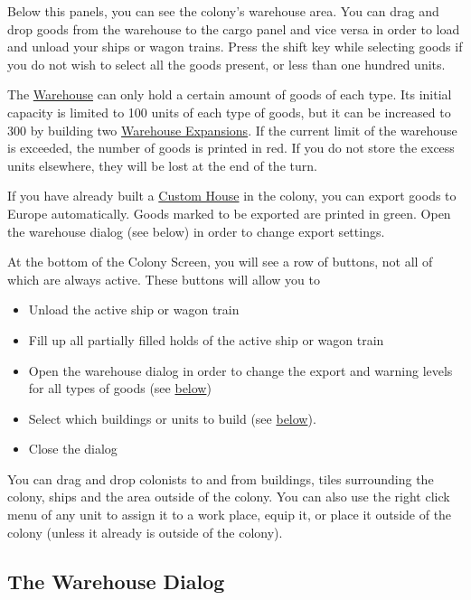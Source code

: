 \documentclass[12pt]{book}
\begin{document}
Below this panels, you can see the colony's warehouse area. You can
drag and drop goods from the warehouse to the cargo panel and vice
versa in order to load and unload your ships or wagon trains. Press
the shift key while selecting goods if you do not wish to select all
the goods present, or less than one hundred units.

The \hyperlink{Warehouse}{Warehouse} can only hold a certain amount of
goods of each type. Its initial capacity is limited to 100 units of
each type of goods, but it can be increased to 300 by building two
\hyperlink{Warehouse Expansion}{Warehouse Expansions}. If the current
limit of the warehouse is exceeded, the number of goods is printed in
red. If you do not store the excess units elsewhere, they will be lost
at the end of the turn.

If you have already built a \hyperlink{Custom House}{Custom House} in
the colony, you can export goods to Europe automatically. Goods marked
to be exported are printed in green. Open the warehouse dialog (see
below) in order to change export settings.

At the bottom of the Colony Screen, you will see a row of buttons, not
all of which are always active. These buttons will allow you to

\begin{itemize}
\item Unload the active ship or wagon train
\item Fill up all partially filled holds of the active ship or
wagon train
\item Open the warehouse dialog in order to change the export and
  warning levels for all types of goods (see \hyperlink{The Warehouse
    Dialog}{below})
\item Select which buildings or units to build (see \hyperlink{The
  Build Queue Panel}{below}).
\item Close the dialog
\end{itemize}

You can drag and drop colonists to and from buildings, tiles
surrounding the colony, ships and the area outside of the colony. You
can also use the right click menu of any unit to assign it to a work
place, equip it, or place it outside of the colony (unless it already
is outside of the colony).



\hypertarget{The Warehouse Dialog}{\subsection{The Warehouse Dialog}}
\end{document}
